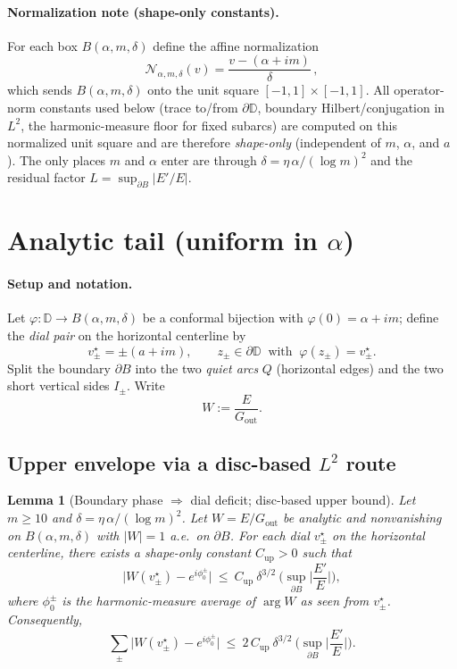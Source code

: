 \documentclass[11pt]{article}
\numberwithin{equation}{section}
\newtheorem{lemma}[theorem]{Lemma}
\theoremstyle{remark}
\newcommand{\D}{\mathbb{D}}
\newcommand{\Gout}{G_{\mathrm{out}}}
\begin{document}
\paragraph{Normalization note (shape-only constants).}
For each box $B(\alpha,m,\delta)$ define the affine normalization
\[
\mathcal N_{\alpha,m,\delta}(v)=\frac{v-(\alpha+im)}{\delta}\,,
\]
which sends $B(\alpha,m,\delta)$ onto the unit square $[-1,1]\times[-1,1]$. All operator-norm constants used below
(trace to/from $\partial\D$, boundary Hilbert/conjugation in $L^2$, the harmonic-measure floor for fixed subarcs) are computed on this normalized unit square and are therefore \emph{shape-only} (independent of $m$, $\alpha$, and $a$). The only places $m$ and $\alpha$ enter are through $\delta=\eta\,\alpha/(\log m)^2$ and the residual factor $L=\sup_{\partial B}|E'/E|$.

\section{Analytic tail (uniform in \texorpdfstring{$\alpha$}{alpha})}\label{sec:tail}

\paragraph{Setup and notation.}
Let $\varphi:\D\to B(\alpha,m,\delta)$ be a conformal bijection with $\varphi(0)=\alpha+im$; define the \emph{dial pair} on the horizontal centerline by
\[
v_\pm^\star=\pm(a+im),\qquad z_\pm\in\partial\D\ \text{ with }\ \varphi(z_\pm)=v_\pm^\star.
\]
Split the boundary $\partial B$ into the two \emph{quiet arcs} $Q$ (horizontal edges) and the two short vertical sides $I_\pm$.
Write
\[
W:=\frac{E}{\Gout}.
\]

\subsection{Upper envelope via a disc-based $L^2$ route}\label{subsec:upper}

\begin{lemma}[Boundary phase $\Rightarrow$ dial deficit; disc-based upper bound]\label{lem:upper-disc}
Let $m\ge 10$ and $\delta=\eta\,\alpha/(\log m)^2$. Let $W=E/\Gout$ be analytic and nonvanishing on $B(\alpha,m,\delta)$ with $|W|=1$ a.e.\ on $\partial B$. For each dial $v_\pm^\star$ on the horizontal centerline, there exists a shape-only constant $C_{\mathrm{up}}>0$ such that
\[
\big|W(v_\pm^\star)-e^{i\phi_0^\pm}\big|
\ \le\ C_{\mathrm{up}}\ \delta^{3/2}\ \Big(\sup_{\partial B}\Big|\frac{E'}{E}\Big|\Big),
\]
where $\phi_0^\pm$ is the harmonic-measure average of $\arg W$ as seen from $v_\pm^\star$. Consequently,
\[
\sum_{\pm}\big|W(v_\pm^\star)-e^{i\phi_0^\pm}\big|
\ \le\ 2\,C_{\mathrm{up}}\ \delta^{3/2}\ \Big(\sup_{\partial B}\Big|\frac{E'}{E}\Big|\Big).
\]
\end{lemma}
\end{document}
